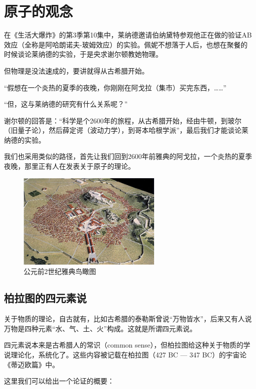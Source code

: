 \section{原子的观念}

在《生活大爆炸》的第3季第10集中，莱纳德邀请伯纳黛特参观他正在做的验证AB效应（全称是阿哈朗诺夫-玻姆效应）的实验。佩妮不想落于人后，也想在聚餐的时候谈论莱纳德的实验，于是央求谢尔顿教她物理。

但物理是没法速成的，要讲就得从古希腊开始。

“假想在一个炎热的夏季的夜晚，你刚刚在阿戈拉（集市）买完东西，……”

“但，这与莱纳德的研究有什么关系呢？”

谢尔顿的回答是：“科学是个2600年的旅程，从古希腊开始，经由牛顿，到玻尔（旧量子论），然后薛定谔（波动力学），到哥本哈根学派”，最后我们才能谈论莱纳德的实验。

我们也采用类似的路径，首先让我们回到2600年前雅典的阿戈拉，一个炎热的夏季夜晚，那里正有人在发表关于原子的理论。

\begin{figure}[htbp]
\begin{center}
\includegraphics[width=7cm]{Preface/athens2ndc.jpg}
\caption{公元前2世纪雅典鸟瞰图}
\end{center}
\end{figure}



\subsection{柏拉图的四元素说}

关于物质的理论，自古就有，比如古希腊的泰勒斯曾说“万物皆水”，后来又有人说万物是四种元素“水、气、土、火”构成。这就是所谓四元素说。

四元素说本来是古希腊人的常识（common sense），但柏拉图给这种关于物质的学说理论化，系统化了。这些内容被记载在柏拉图（427 BC — 347 BC）的宇宙论《蒂迈欧篇》中。

这里我们可以给出一个论证的概要：

